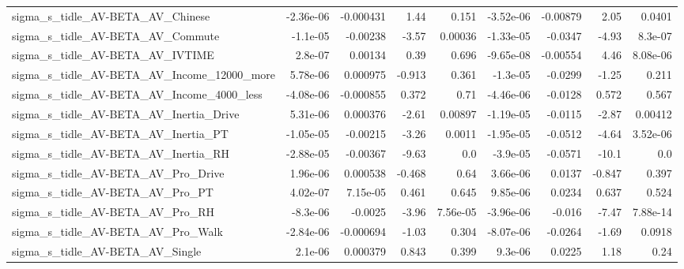 \begin{tabular}{lrrrrrrrr}
sigma\_s\_tidle\_AV-BETA\_AV\_Chinese                   &   -2.36e-06 &    -0.000431 &     1.44 &    0.151 &  -3.52e-06 &    -0.00879 &         2.05 &        0.0401 \\
sigma\_s\_tidle\_AV-BETA\_AV\_Commute                   &    -1.1e-05 &     -0.00238 &    -3.57 &  0.00036 &  -1.33e-05 &     -0.0347 &        -4.93 &       8.3e-07 \\
sigma\_s\_tidle\_AV-BETA\_AV\_IVTIME                    &     2.8e-07 &      0.00134 &     0.39 &    0.696 &  -9.65e-08 &    -0.00554 &         4.46 &      8.08e-06 \\
sigma\_s\_tidle\_AV-BETA\_AV\_Income\_12000\_more         &    5.78e-06 &     0.000975 &   -0.913 &    0.361 &   -1.3e-05 &     -0.0299 &        -1.25 &         0.211 \\
sigma\_s\_tidle\_AV-BETA\_AV\_Income\_4000\_less          &   -4.08e-06 &    -0.000855 &    0.372 &     0.71 &  -4.46e-06 &     -0.0128 &        0.572 &         0.567 \\
sigma\_s\_tidle\_AV-BETA\_AV\_Inertia\_Drive             &    5.31e-06 &     0.000376 &    -2.61 &  0.00897 &  -1.19e-05 &     -0.0115 &        -2.87 &       0.00412 \\
sigma\_s\_tidle\_AV-BETA\_AV\_Inertia\_PT                &   -1.05e-05 &     -0.00215 &    -3.26 &   0.0011 &  -1.95e-05 &     -0.0512 &        -4.64 &      3.52e-06 \\
sigma\_s\_tidle\_AV-BETA\_AV\_Inertia\_RH                &   -2.88e-05 &     -0.00367 &    -9.63 &      0.0 &   -3.9e-05 &     -0.0571 &        -10.1 &           0.0 \\
sigma\_s\_tidle\_AV-BETA\_AV\_Pro\_Drive                 &    1.96e-06 &     0.000538 &   -0.468 &     0.64 &   3.66e-06 &      0.0137 &       -0.847 &         0.397 \\
sigma\_s\_tidle\_AV-BETA\_AV\_Pro\_PT                    &    4.02e-07 &     7.15e-05 &    0.461 &    0.645 &   9.85e-06 &      0.0234 &        0.637 &         0.524 \\
sigma\_s\_tidle\_AV-BETA\_AV\_Pro\_RH                    &    -8.3e-06 &      -0.0025 &    -3.96 & 7.56e-05 &  -3.96e-06 &      -0.016 &        -7.47 &      7.88e-14 \\
sigma\_s\_tidle\_AV-BETA\_AV\_Pro\_Walk                  &   -2.84e-06 &    -0.000694 &    -1.03 &    0.304 &  -8.07e-06 &     -0.0264 &        -1.69 &        0.0918 \\
sigma\_s\_tidle\_AV-BETA\_AV\_Single                    &     2.1e-06 &     0.000379 &    0.843 &    0.399 &    9.3e-06 &      0.0225 &         1.18 &          0.24 \\

\end{tabular}
